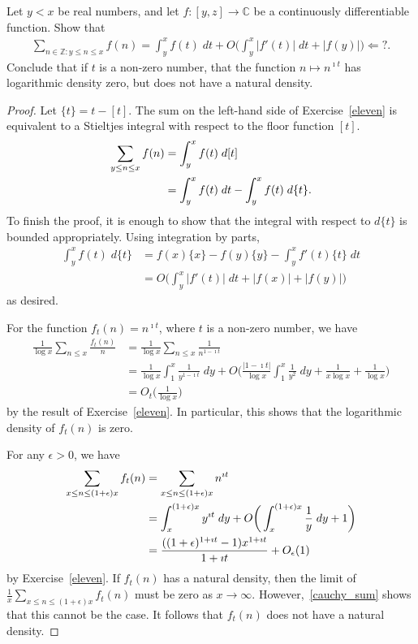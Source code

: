 \documentclass[11pt]{article}
\newenvironment{ex}[1]
  {\renewcommand\theinnercustomthm{#1}\innercustomthm}
  {\endinnercustomthm}
\begin{document}
\begin{ex}{11}\label{eleven}
Let $y<x$ be real numbers, and let $f:[y,z]\to\mathbb{C}$ be a continuously differentiable function. Show that
\begin{align*}
\sum_{n\in\mathbb{Z}:y\leq n\leq x}f(n)=\int_y^xf(t)\;dt+O\bigg(\int_y^x|f'(t)|\;dt+|f(y)|\bigg)\Leftarrow ?.
\end{align*}
Conclude that if $t$ is a non-zero number, that the function $n\mapsto n^{\imath t}$ has logarithmic density zero, but does not have a natural density.
\end{ex}

\begin{proof}
Let $\{t\}=t-[t]$. The sum on the left-hand side of Exercise~\ref{eleven} is equivalent to a Stieltjes integral with respect to the floor function $[t]$.
\begin{align}
\sum_{y\leq n\leq x}f(n) &= \int_y^xf(t)\;d[t]\notag\\
&= \int_y^xf(t)\;dt-\int_y^xf(t)\;d\{t\}\label{two_int}.
\end{align}
To finish the proof, it is enough to show that the integral with respect to $d\{t\}$ is bounded appropriately. Using integration by parts,
\begin{align*}
\int_y^xf(t)\;d\{t\} &= f(x)\{x\}-f(y)\{y\}-\int_y^xf'(t)\{t\}\;dt\\
&= O\bigg(\int_y^x|f'(t)|\;dt+|f(x)|+|f(y)|\bigg)
\end{align*}
as desired.

For the function $f_t(n)=n^{\imath t}$, where $t$ is a non-zero number, we have
\begin{align*}
\frac{1}{\log{x}}\sum_{n\leq x}\frac{f_t(n)}{n} &= \frac{1}{\log{x}}\sum_{n\leq x}\frac{1}{n^{1-\imath t}}\\
&= \frac{1}{\log{x}}\int_1^x\frac{1}{y^{1-\imath t}}\;dy+O\bigg(\frac{|1-\imath t|}{\log{x}}\int_1^x\frac{1}{y^2}\;dy+\frac{1}{x\log{x}}+\frac{1}{\log{x}}\bigg)\\
&= O_t\bigg(\frac{1}{\log{x}}\bigg)
\end{align*}
by the result of Exercise~\ref{eleven}. In particular, this shows that the logarithmic density of $f_t(n)$ is zero.

For any $\epsilon>0$, we have
\begin{align}
\sum_{x\leq n\leq (1+\epsilon)x}f_t(n) &= \sum_{x\leq n\leq (1+\epsilon)x}n^{\imath t}\notag\\
&= \int_x^{(1+\epsilon)x}y^{\imath t}\;dy+O\bigg(\int_x^{(1+\epsilon)x}\frac{1}{y}\;dy+1\bigg)\notag\\
&= \frac{((1+\epsilon)^{1+\imath t}-1)x^{1+\imath t}}{1+\imath t}+O_\epsilon(1)\label{cauchy_sum}
\end{align}
by Exercise~\ref{eleven}. If $f_t(n)$ has a natural density, then the limit of $\frac{1}{x}\sum_{x\leq n\leq (1+\epsilon)x}f_t(n)$ must be zero as $x\to\infty$. However,~\eqref{cauchy_sum} shows that this cannot be the case. It follows that $f_t(n)$ does not have a natural density.
\end{proof}
\end{document}
